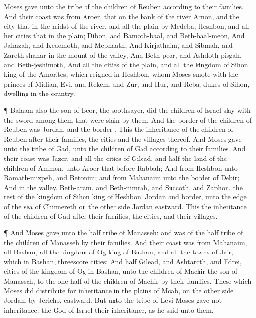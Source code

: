 {Moses
gave unto the
tribe of the
children of
Reuben
{} according to their
families.
And their
coast was from
Aroer, that
{} on the
bank of the
river
Arnon, and the
city that
{} in the
midst of the
river, and all the
plain by
Medeba;
Heshbon, and all her
cities that
{} in the
plain;
Dibon, and
Bamoth-baal, and
Beth-baal-meon,
And
Jahazah, and
Kedemoth, and
Mephaath,
And
Kirjathaim, and
Sibmah, and
Zareth-shahar in the
mount of the
valley,
And
Beth-peor, and
Ashdoth-pisgah, and
Beth-jeshimoth,
And all the
cities of the
plain, and all the
kingdom of
Sihon
king of the
Amorites, which
reigned in
Heshbon, whom
Moses
smote with the
princes of
Midian,
Evi, and
Rekem, and
Zur, and
Hur, and
Reba,
{}
dukes of
Sihon,
dwelling in the
country.
\par }{\PP {}¶
Balaam also the
son of
Beor, the
soothsayer, did the
children of
Israel
slay with the
sword among
them that were
slain by them.
And the
border of the
children of
Reuben was
Jordan, and the
border
{}. This
{} the
inheritance of the
children of
Reuben after their
families, the
cities and the
villages thereof.
And
Moses
gave
{} unto the
tribe of
Gad,
{} unto the
children of
Gad according to their
families.
And their
coast was
Jazer, and all the
cities of
Gilead, and
half the
land of the
children of
Ammon, unto
Aroer that
{}
before
Rabbah;
And from
Heshbon unto
Ramath-mizpeh, and
Betonim; and from
Mahanaim unto the
border of
Debir;
And in the
valley,
Beth-aram, and
Beth-nimrah, and
Succoth, and
Zaphon, the
rest of the
kingdom of
Sihon
king of
Heshbon,
Jordan and
{}
border,
{} unto the
edge of the
sea of
Chinnereth on the other
side
Jordan
eastward.
This
{} the
inheritance of the
children of
Gad after their
families, the
cities, and their
villages.
\par }{\PP {}¶ And
Moses
gave
{} unto the
half
tribe of
Manasseh: and
{} was
{} of the
half
tribe of the
children of
Manasseh by their
families.
And their
coast was from
Mahanaim, all
Bashan, all the
kingdom of
Og
king of
Bashan, and all the
towns of
Jair, which
{} in
Bashan,
threescore
cities:
And
half
Gilead, and
Ashtaroth, and
Edrei,
cities of the
kingdom of
Og in
Bashan,
{} unto the
children of
Machir the
son of
Manasseh,
{} to the one
half of the
children of
Machir by their
families.
These
{} which
Moses did distribute for
inheritance in the
plains of
Moab, on the other
side
Jordan, by
Jericho,
eastward.
But unto the
tribe of
Levi
Moses
gave not
{}
inheritance: the
{}
God of
Israel
{} their
inheritance, as he
said unto them.

}
